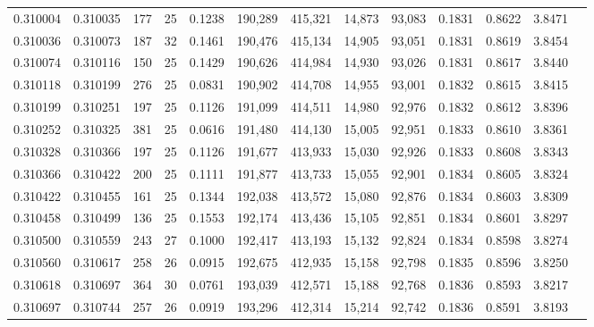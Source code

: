 \begin{tabular}{rrrrrrrrrrrrr}
0.310004 & 0.310035 &   177 &  25 &                                     0.1238 & 190,289 & 415,321 &  14,873 &  93,083 & 0.1831 & 0.8622 & 3.8471 \\
0.310036 & 0.310073 &   187 &  32 &                                     0.1461 & 190,476 & 415,134 &  14,905 &  93,051 & 0.1831 & 0.8619 & 3.8454 \\
0.310074 & 0.310116 &   150 &  25 &                                     0.1429 & 190,626 & 414,984 &  14,930 &  93,026 & 0.1831 & 0.8617 & 3.8440 \\
0.310118 & 0.310199 &   276 &  25 &                                     0.0831 & 190,902 & 414,708 &  14,955 &  93,001 & 0.1832 & 0.8615 & 3.8415 \\
0.310199 & 0.310251 &   197 &  25 &                                     0.1126 & 191,099 & 414,511 &  14,980 &  92,976 & 0.1832 & 0.8612 & 3.8396 \\
0.310252 & 0.310325 &   381 &  25 &                                     0.0616 & 191,480 & 414,130 &  15,005 &  92,951 & 0.1833 & 0.8610 & 3.8361 \\
0.310328 & 0.310366 &   197 &  25 &                                     0.1126 & 191,677 & 413,933 &  15,030 &  92,926 & 0.1833 & 0.8608 & 3.8343 \\
0.310366 & 0.310422 &   200 &  25 &                                     0.1111 & 191,877 & 413,733 &  15,055 &  92,901 & 0.1834 & 0.8605 & 3.8324 \\
0.310422 & 0.310455 &   161 &  25 &                                     0.1344 & 192,038 & 413,572 &  15,080 &  92,876 & 0.1834 & 0.8603 & 3.8309 \\
0.310458 & 0.310499 &   136 &  25 &                                     0.1553 & 192,174 & 413,436 &  15,105 &  92,851 & 0.1834 & 0.8601 & 3.8297 \\
0.310500 & 0.310559 &   243 &  27 &                                     0.1000 & 192,417 & 413,193 &  15,132 &  92,824 & 0.1834 & 0.8598 & 3.8274 \\
0.310560 & 0.310617 &   258 &  26 &                                     0.0915 & 192,675 & 412,935 &  15,158 &  92,798 & 0.1835 & 0.8596 & 3.8250 \\
0.310618 & 0.310697 &   364 &  30 &                                     0.0761 & 193,039 & 412,571 &  15,188 &  92,768 & 0.1836 & 0.8593 & 3.8217 \\
0.310697 & 0.310744 &   257 &  26 &                                     0.0919 & 193,296 & 412,314 &  15,214 &  92,742 & 0.1836 & 0.8591 & 3.8193 \\

\end{tabular}
